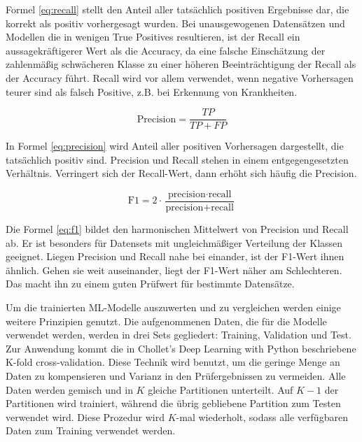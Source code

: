 Formel \ref{eq:recall} stellt den Anteil aller tatsächlich positiven Ergebnisse dar, die korrekt als positiv vorhergesagt wurden. Bei unausgewogenen Datensätzen und Modellen die in wenigen True Positives resultieren, ist der Recall ein aussagekräftigerer Wert als die Accuracy, da eine falsche Einschätzung der zahlenmäßig schwächeren Klasse zu einer höheren Beeinträchtigung der Recall als der Accuracy führt. Recall wird vor allem verwendet, wenn negative Vorhersagen teurer sind als falsch Positive, z.B. bei Erkennung von Krankheiten. \cite{GoogleML2026}

\begin{equation}
    \text{Precision} = \frac{TP}{TP + FP}
    \label{eq:precision}    
\end{equation}

In Formel \ref{eq:precision} wird Anteil aller positiven Vorhersagen dargestellt, die tatsächlich positiv sind. Precision und Recall stehen in einem entgegengesetzten Verhältnis. Verringert sich der Recall-Wert, dann erhöht sich häufig die Precision. \cite{GoogleML2026}

\begin{equation}
    \text{F1} = 2 \cdot \frac{\text{precision} \cdot \text{recall}}{\text{precision} + \text{recall}}
    \label{eq:f1}
\end{equation}

Die Formel \ref{eq:f1} bildet den harmonischen Mittelwert von Precision und Recall ab. Er ist besonders für Datensets mit ungleichmäßiger Verteilung der Klassen geeignet. Liegen Precision und Recall nahe bei einander, ist der F1-Wert ihnen ähnlich. Gehen sie weit auseinander, liegt der F1-Wert näher am Schlechteren. Das macht ihn zu einem guten Prüfwert für bestimmte Datensätze. \cite{GoogleML2026}

Um die trainierten ML-Modelle auszuwerten und zu vergleichen werden einige weitere Prinzipien genutzt. Die aufgenommenen Daten, die für die Modelle verwendet werden, werden in drei Sets gegliedert: Training, Validation und Test. Zur Anwendung kommt die in Chollet's Deep Learning with Python beschriebene K-fold cross-validation. Diese Technik wird benutzt, um die geringe Menge an Daten zu kompensieren und Varianz in den Prüfergebnissen zu vermeiden. Alle Daten werden gemisch und in $K$ gleiche Partitionen unterteilt. Auf $K - 1$ der Partitionen wird trainiert, während die übrig gebliebene Partition zum Testen verwendet wird. Diese Prozedur wird $K$-mal wiederholt, sodass alle verfügbaren Daten zum Training verwendet werden. \cite{Chollet2025}

